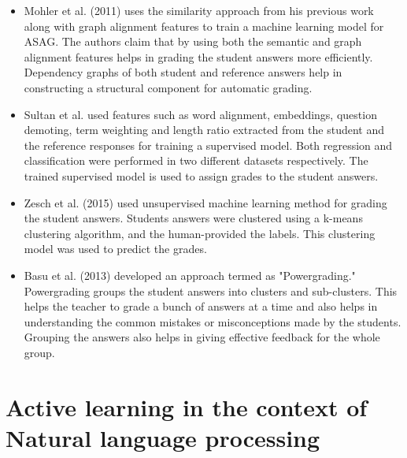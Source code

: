 \begin{itemize}
	\item Mohler et al. (2011) \cite{Mohler2011} uses the similarity approach from his previous work \cite{Mohler2009} along with graph alignment features to train a machine learning model for ASAG. The authors claim that by using both the semantic and graph alignment features helps in grading the student answers more efficiently. Dependency graphs of both student and reference answers help in constructing a structural component for automatic grading.
	
	
	\item Sultan et al. \cite{Sultan2016} used features such as word alignment, embeddings, question demoting, term weighting and length ratio extracted from the student and the reference responses for training a supervised model. Both regression and classification were performed in two different datasets respectively. The trained supervised model is used to assign grades to the student answers.
	
	\item Zesch et al. (2015) \cite{zesch2015}  used unsupervised machine learning method for grading the student answers. Students answers were clustered using a k-means clustering algorithm, and the human-provided the labels. This clustering model was used to predict the grades.
	
	\item Basu et al. (2013) \cite{Basu2013} developed an approach termed as "Powergrading." Powergrading groups the student answers into clusters and sub-clusters. This helps the teacher to grade a bunch of answers at a time and also helps in understanding the common mistakes or misconceptions made by the students. Grouping the answers also helps in giving effective feedback for the whole group.
	
\end{itemize}

\section{Active learning in the context of  Natural language processing}

